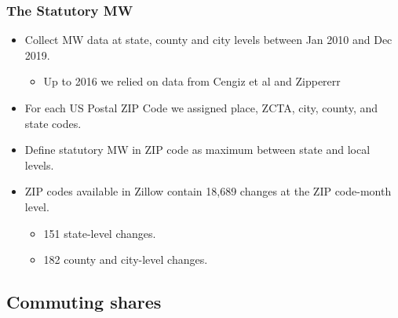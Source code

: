 \documentclass[aspectratio=169, t]{beamer}
\begin{document}
\begin{frame}[label=stat_MW]
	\frametitle{The Statutory MW}
	
	\begin{itemize}
		\item
		Collect MW data at state, county and city levels between Jan 2010 and Dec 2019.
		\begin{itemize}
		    \item Up to 2016 we relied on data from Cengiz et al and Zippererr 
		\end{itemize}
		
		\vspace{2mm} \item
		For each US Postal ZIP Code we assigned place, ZCTA, city, county, and state codes. 
						
		\vspace{2mm} \item
		Define statutory MW in ZIP code as maximum between state and local levels.
		
		\pause
		\vspace{2mm} \item
		ZIP codes available in Zillow contain 18,689 changes at the ZIP code-month level.
		\vspace{-3.5mm} 
		\begin{itemize} \small
			\item 151 state-level changes.
			\item 182 county and city-level changes.
		\end{itemize}
		 
		\hyperlink{dist_mw_changes}{}

	\end{itemize}
	
\end{frame}

\subsection{Commuting shares}
\end{document}
